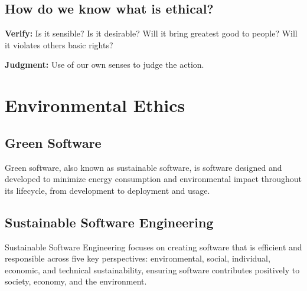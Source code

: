 \subsection{How do we know what is ethical?}

\textbf{Verify:} 
Is it sensible?
Is it desirable?
Will it bring greatest good to people?
Will it violates others basic rights?

\textbf{Judgment:} Use of our own senses to judge the action.


\section{Environmental Ethics}

\subsection{Green Software}
Green software, also known as sustainable software, is software designed and developed to minimize energy consumption and environmental impact throughout its lifecycle, from development to deployment and usage.

\subsection{Sustainable Software Engineering}
Sustainable Software Engineering focuses on creating software that is efficient and responsible across five key perspectives: environmental, social, individual, economic, and technical sustainability, ensuring software contributes positively to society, economy, and the environment.